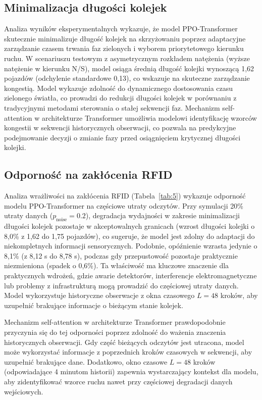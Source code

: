 \documentclass[12pt,a4paper]{article}
\begin{document}
\subsection{Minimalizacja długości kolejek}

Analiza wyników eksperymentalnych wykazuje, że model PPO-Transformer skutecznie minimalizuje długość kolejek na skrzyżowaniu poprzez adaptacyjne zarządzanie czasem trwania faz zielonych i wyborem priorytetowego kierunku ruchu. W scenariuszu testowym z asymetrycznym rozkładem natężenia (wyższe natężenie w kierunku N/S), model osiąga średnią długość kolejki wynoszącą 1,62 pojazdów (odchylenie standardowe 0,13), co wskazuje na skuteczne zarządzanie kongestią. Model wykazuje zdolność do dynamicznego dostosowania czasu zielonego światła, co prowadzi do redukcji długości kolejek w porównaniu z tradycyjnymi metodami sterowania o stałej sekwencji faz. Mechanizm self-attention w architekturze Transformer umożliwia modelowi identyfikację wzorców kongestii w sekwencji historycznych obserwacji, co pozwala na predykcyjne podejmowanie decyzji o zmianie fazy przed osiągnięciem krytycznej długości kolejki.

\subsection{Odporność na zakłócenia RFID}

Analiza wrażliwości na zakłócenia RFID (Tabela~\ref{tab:5}) wykazuje odporność modelu PPO-Transformer na częściowe utraty odczytów. Przy symulacji 20\% utraty danych ($p_{\text{noise}} = 0.2$), degradacja wydajności w zakresie minimalizacji długości kolejek pozostaje w akceptowalnych granicach (wzrost długości kolejki o 8,0\% z 1,62 do 1,75 pojazdów), co sugeruje, że model jest zdolny do adaptacji do niekompletnych informacji sensorycznych. Podobnie, opóźnienie wzrasta jedynie o 8,1\% (z 8,12 s do 8,78 s), podczas gdy przepustowość pozostaje praktycznie niezmieniona (spadek o 0,6\%). Ta właściwość ma kluczowe znaczenie dla praktycznych wdrożeń, gdzie awarie detektorów, interferencje elektromagnetyczne lub problemy z infrastrukturą mogą prowadzić do częściowej utraty danych. Model wykorzystuje historyczne obserwacje z okna czasowego $L = 48$ kroków, aby uzupełnić brakujące informacje o bieżącym stanie kolejek.

Mechanizm self-attention w architekturze Transformer prawdopodobnie przyczynia się do tej odporności poprzez zdolność do ważenia znaczenia historycznych obserwacji. Gdy część bieżących odczytów jest utracona, model może wykorzystać informacje z poprzednich kroków czasowych w sekwencji, aby uzupełnić brakujące dane. Dodatkowo, okno czasowe $L = 48$ kroków (odpowiadające 4 minutom historii) zapewnia wystarczający kontekst dla modelu, aby zidentyfikować wzorce ruchu nawet przy częściowej degradacji danych wejściowych.
\end{document}
